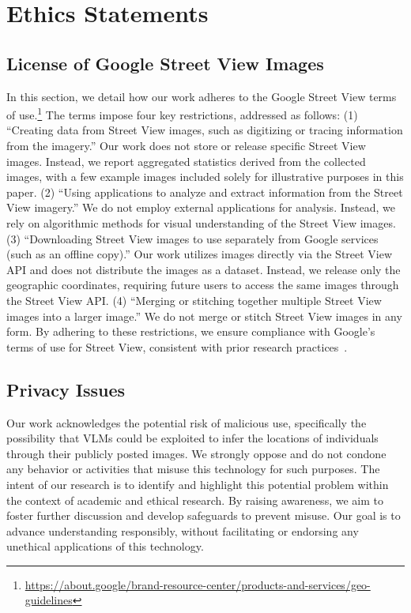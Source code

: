 \section*{Ethics Statements}

\subsection*{License of Google Street View Images}
\label{sec:license}

In this section, we detail how our work adheres to the Google Street View terms of use.\footnote{\url{https://about.google/brand-resource-center/products-and-services/geo-guidelines}}
The terms impose four key restrictions, addressed as follows:
(1) ``Creating data from Street View images, such as digitizing or tracing information from the imagery.''
Our work does not store or release specific Street View images.
Instead, we report aggregated statistics derived from the collected images, with a few example images included solely for illustrative purposes in this paper.
(2) ``Using applications to analyze and extract information from the Street View imagery.''
We do not employ external applications for analysis.
Instead, we rely on algorithmic methods for visual understanding of the Street View images.
(3) ``Downloading Street View images to use separately from Google services (such as an offline copy).''
Our work utilizes images directly via the Street View API and does not distribute the images as a dataset.
Instead, we release only the geographic coordinates, requiring future users to access the same images through the Street View API.
(4) ``Merging or stitching together multiple Street View images into a larger image.''
We do not merge or stitch Street View images in any form.
By adhering to these restrictions, we ensure compliance with Google’s terms of use for Street View, consistent with prior research practices~\cite{fan2023urban, gebru2017using, ki2021analyzing}.

\subsection*{Privacy Issues}

Our work acknowledges the potential risk of malicious use, specifically the possibility that VLMs could be exploited to infer the locations of individuals through their publicly posted images.
We strongly oppose and do not condone any behavior or activities that misuse this technology for such purposes.
The intent of our research is to identify and highlight this potential problem within the context of academic and ethical research.
By raising awareness, we aim to foster further discussion and develop safeguards to prevent misuse.
Our goal is to advance understanding responsibly, without facilitating or endorsing any unethical applications of this technology.

